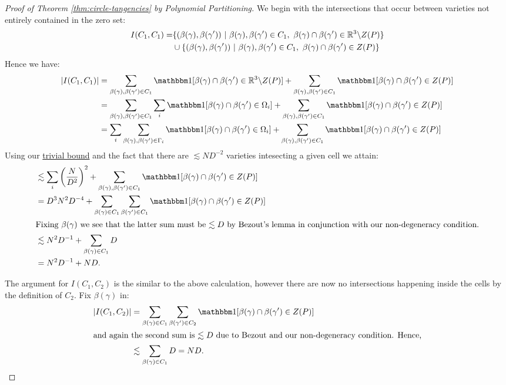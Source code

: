 \begin{proof}[Proof of Theorem \ref{thm:circle-tangencies} by Polynomial Partitioning]
We begin with the intersections that occur between varieties not entirely contained in the zero set:
\begin{align*}
    I(C_1,C_1) = &\{ (\beta(\gamma), \beta(\gamma')) \ |  \ \beta(\gamma), \beta(\gamma') \in C_1, \ \beta(\gamma) \cap \beta(\gamma') \in \RR^3 \backslash Z(P)\} \\
                & \cup \{ (\beta(\gamma), \beta(\gamma')) \ |  \ \beta(\gamma), \beta(\gamma') \in C_1, \ \beta(\gamma) \cap \beta(\gamma') \in Z(P)\}
\end{align*}
Hence we have:
\begin{align*}
    |I(C_1,C_1)| &= \sum_{\beta(\gamma), \beta(\gamma') \in C_1} \OO[\beta(\gamma) \cap \beta(\gamma') \in \RR^3 \backslash Z(P)] + 
                  \sum_{\beta(\gamma), \beta(\gamma') \in C_1} \OO[\beta(\gamma) \cap \beta(\gamma') \in Z(P)] \\
                 &= \sum_{\beta(\gamma), \beta(\gamma') \in C_1} \sum_i \OO[\beta(\gamma) \cap \beta(\gamma') \in \Omega_i] +
                 \sum_{\beta(\gamma), \beta(\gamma') \in C_1} \OO[\beta(\gamma) \cap \beta(\gamma') \in Z(P)]\\
                 &= \sum_i \sum_{\beta(\gamma), \beta(\gamma') \in \Gamma_i}  \OO[\beta(\gamma) \cap \beta(\gamma') \in \Omega_i] +
                  \sum_{\beta(\gamma), \beta(\gamma') \in C_1} \OO[\beta(\gamma) \cap \beta(\gamma') \in Z(P)]
\end{align*}
Using our \hyperref[thm:trivial-circle-bound]{trivial bound} and the fact that there are $\lesssim ND^{-2}$ varieties intesecting a given cell we attain:
\begin{align*}
                 &\lesssim \sum_i \left(\frac{N}{D^2}\right)^2 + \sum_{\beta(\gamma), \beta(\gamma') \in C_1} \OO[\beta(\gamma) \cap \beta(\gamma') \in Z(P)] \\
                 &= D^3 N^2 D^{-4} + \sum_{\beta(\gamma)\in C_1} \sum_{\beta(\gamma') \in C_1} \OO[\beta(\gamma) \cap \beta(\gamma') \in Z(P)]\\
                 \intertext{Fixing $\beta(\gamma)$ we see that the latter sum must be $\lesssim D$ by Bezout's lemma in conjunction with our non-degeneracy condition.}
                 &\lesssim  N^2 D^{-1} + \sum_{\beta(\gamma)\in C_1} D \\
                 &= N^2D^{-1} + ND.
\end{align*}

The argument for $I(C_1,C_2)$ is the similar to the above calculation, however there are now no intersections happening inside the cells by the definition of $C_2$.
 Fix $\beta(\gamma)$ in:
\begin{align*}
    |I(C_1,C_2)| &= \sum_{\beta(\gamma)\in C_1} \sum_{\beta(\gamma') \in C_2} \OO[\beta(\gamma) \cap \beta(\gamma') \in Z(P)] \\
    \intertext{and again the second sum is $\lesssim D$ due to Bezout and our non-degeneracy condition. Hence,}
    & \lesssim \sum_{\beta(\gamma)\in C_1} D = ND.
\end{align*}


\end{proof}
